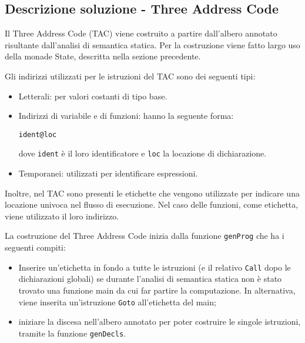 \subsection{Descrizione soluzione - Three Address Code}

Il Three Address Code (TAC) viene costruito a partire dall'albero annotato risultante dall'analisi di semantica statica. Per la costruzione viene fatto largo uso della monade State, descritta nella sezione precedente.

Gli indirizzi utilizzati per le istruzioni del TAC sono dei seguenti tipi:
\begin{itemize}
    \item Letterali: per valori costanti di tipo base.
    \item Indirizzi di variabile e di funzioni: hanno la seguente forma:
    \begin{center}
        {\tt ident@loc}
    \end{center}
    dove {\tt ident} è il loro identificatore e {\tt loc} la locazione di dichiarazione.
    \item Temporanei: utilizzati per identificare espressioni.
\end{itemize}
Inoltre, nel TAC sono presenti le etichette che vengono utilizzate per indicare una locazione univoca nel flusso di esecuzione. Nel caso delle funzioni, come etichetta, viene utilizzato il loro indirizzo.

La costruzione del Three Address Code inizia dalla funzione {\tt genProg} che ha i seguenti compiti:
\begin{itemize}
    \item Inserire un'etichetta in fondo a tutte le istruzioni (e il relativo {\tt Call} dopo le dichiarazioni globali) se durante l'analisi di semantica statica non è stato trovato una funzione main da cui far partire la computazione. In alternativa, viene inserita un'istruzione {\tt Goto} all'etichetta del main;
    \item iniziare la discesa nell'albero annotato per poter costruire le singole istruzioni, tramite la funzione {\tt genDecls}.
\end{itemize}

